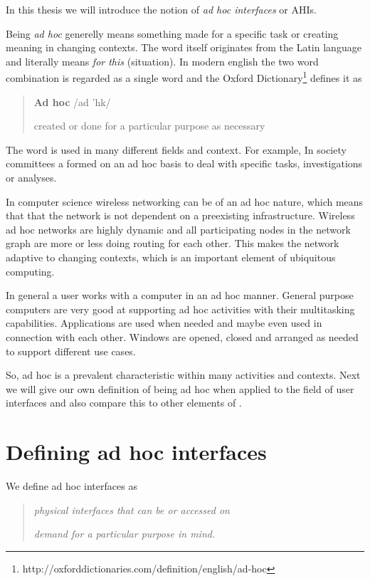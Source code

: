 
In this thesis we will introduce the notion of \emph{ad hoc interfaces} or AHIs.

Being \emph{ad hoc} generelly means something made for a specific task or creating meaning in changing contexts.
The word itself originates from the Latin language and literally means \emph{for this} (situation). 
In modern english the two word combination is regarded as a single word and the Oxford Dictionary\footnote{http://oxforddictionaries.com/definition/english/ad-hoc} defines it as

\begin{quotation}
\textbf{Ad hoc}  /ad 'h\textturnscripta k/

created or done for a particular purpose as necessary
\end{quotation}

The word is used in many different fields and context.
For example, In society committees a formed on an ad hoc basis to deal with specific tasks, investigations or analyses.

In computer science wireless networking can be of an ad hoc nature, which means that that the network is not dependent on a preexisting infrastructure.
Wireless ad hoc networks are highly dynamic and all participating nodes in the network graph are more or less doing routing for each other.
This makes the network adaptive to changing contexts, which is an important element of ubiquitous computing.

In general a user works with a computer in an ad hoc manner.
General purpose computers are very good at supporting ad hoc activities with their multitasking capabilities.
Applications are used when needed and maybe even used in connection with each other.
Windows are opened, closed and arranged as needed to support different use cases.

So, ad hoc is a prevalent characteristic within many activities and contexts.
Next we will give our own definition of being ad hoc when applied to the field of user interfaces and also compare this to other elements of .

\section{Defining ad hoc interfaces} 
We define ad hoc interfaces as 

\begin{quotation}\label{adhoc:definition}
\emph{physical interfaces that can be  or accessed on} 

\emph{demand for a particular purpose in mind. }
\end{quotation}

